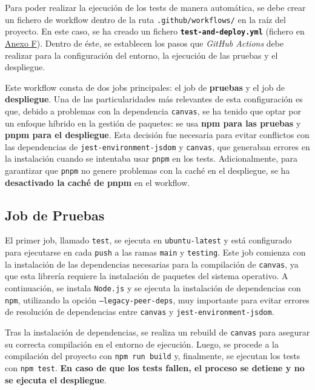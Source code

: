 Para poder realizar la ejecución de los tests de manera automática, se debe crear un fichero de workflow dentro de la ruta \texttt{.github/workflows/} en la raíz del proyecto. En este caso, se ha creado un fichero \textbf{\texttt{test-and-deploy.yml}} (fichero en \hyperref[ch:anexoF]{Anexo F}). Dentro de éste, se establecen los pasos que \textit{GitHub Actions} debe realizar para la configuración del entorno, la ejecución de las pruebas y el despliegue.

Este workflow consta de dos jobs principales: el job de \textbf{pruebas} y el job de \textbf{despliegue}. Una de las particularidades más relevantes de esta configuración es que, debido a problemas con la dependencia \texttt{canvas}, se ha tenido que optar por un enfoque híbrido en la gestión de paquetes: se usa \textbf{npm para las pruebas} y \textbf{pnpm para el despliegue}. Esta decisión fue necesaria para evitar conflictos con las dependencias de \texttt{jest-environment-jsdom} y \texttt{canvas}, que generaban errores en la instalación cuando se intentaba usar \texttt{pnpm} en los tests. Adicionalmente, para garantizar que \texttt{pnpm} no genere problemas con la caché en el despliegue, se ha \textbf{desactivado la caché de pnpm} en el workflow.

\subsection*{Job de Pruebas}

El primer job, llamado \texttt{test}, se ejecuta en \texttt{ubuntu-latest} y está configurado para ejecutarse en cada \texttt{push} a las ramas \texttt{main} y \texttt{testing}. Este job comienza con la instalación de las dependencias necesarias para la compilación de \texttt{canvas}, ya que esta librería requiere la instalación de paquetes del sistema operativo. A continuación, se instala \texttt{Node.js} y se ejecuta la instalación de dependencias con \texttt{npm}, utilizando la opción \texttt{--legacy-peer-deps}, muy importante para evitar errores de resolución de dependencias entre \texttt{canvas} y \texttt{jest-environment-jsdom}.

Tras la instalación de dependencias, se realiza un rebuild de \texttt{canvas} para asegurar su correcta compilación en el entorno de ejecución. Luego, se procede a la compilación del proyecto con \texttt{npm run build} y, finalmente, se ejecutan los tests con \texttt{npm test}. \textbf{En caso de que los tests fallen, el proceso se detiene y no se ejecuta el despliegue}.


